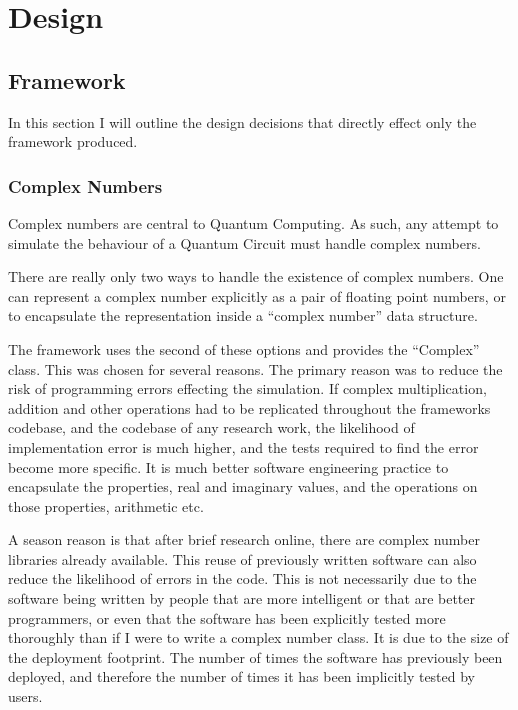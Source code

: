 \chapter{Design}

\section{Framework}
In this section I will outline the design decisions that directly effect only the framework produced.

\subsection{Complex Numbers}
Complex numbers are central to Quantum Computing.
As such, any attempt to simulate the behaviour of a Quantum Circuit must handle complex numbers.

There are really only two ways to handle the existence of complex numbers.
One can represent a complex number explicitly as a pair of floating point numbers, or to encapsulate the representation inside a ``complex number'' data structure.

The framework uses the second of these options and provides the ``Complex'' class.
This was chosen for several reasons.
The primary reason was to reduce the risk of programming errors effecting the simulation.
If complex multiplication, addition and other operations had to be replicated throughout the frameworks codebase, and the codebase of any research work, the likelihood of implementation error is much higher, and the tests required to find the error become more specific.
It is much better software engineering practice to encapsulate the properties, real and imaginary values, and the operations on those properties, arithmetic etc.

A season reason is that after brief research online, there are complex number libraries already available.
This reuse of previously written software can also reduce the likelihood of errors in the code.
This is not necessarily due to the software being written by people that are more intelligent or that are better programmers, or even that the software has been explicitly tested more thoroughly than if I were to write a complex number class.
It is due to the size of the deployment footprint.
The number of times the software has previously been deployed, and therefore the number of times it has been implicitly tested by users.

